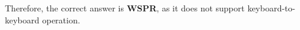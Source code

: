 Therefore, the correct answer is \textbf{WSPR}, as it does not support keyboard-to-keyboard operation.

